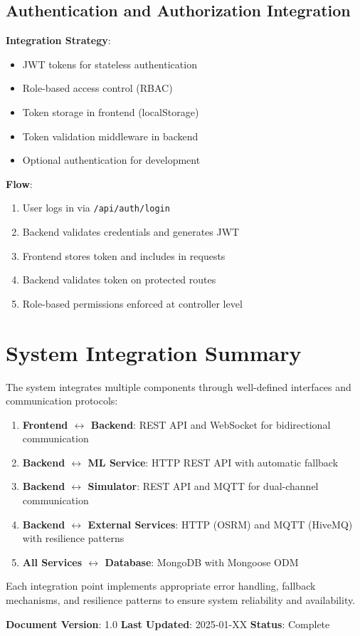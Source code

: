 \subsection{Authentication and Authorization Integration}

\textbf{Integration Strategy}:
\begin{itemize}
    \item JWT tokens for stateless authentication
    \item Role-based access control (RBAC)
    \item Token storage in frontend (localStorage)
    \item Token validation middleware in backend
    \item Optional authentication for development
\end{itemize}

\textbf{Flow}:
\begin{enumerate}
    \item User logs in via \texttt{/api/auth/login}
    \item Backend validates credentials and generates JWT
    \item Frontend stores token and includes in requests
    \item Backend validates token on protected routes
    \item Role-based permissions enforced at controller level
\end{enumerate}

\section{System Integration Summary}

The system integrates multiple components through well-defined interfaces and communication protocols:

\begin{enumerate}
    \item \textbf{Frontend $\leftrightarrow$ Backend}: REST API and WebSocket for bidirectional communication
    \item \textbf{Backend $\leftrightarrow$ ML Service}: HTTP REST API with automatic fallback
    \item \textbf{Backend $\leftrightarrow$ Simulator}: REST API and MQTT for dual-channel communication
    \item \textbf{Backend $\leftrightarrow$ External Services}: HTTP (OSRM) and MQTT (HiveMQ) with resilience patterns
    \item \textbf{All Services $\leftrightarrow$ Database}: MongoDB with Mongoose ODM
\end{enumerate}

Each integration point implements appropriate error handling, fallback mechanisms, and resilience patterns to ensure system reliability and availability.

\textbf{Document Version}: 1.0  
\textbf{Last Updated}: 2025-01-XX  
\textbf{Status}: \checkmark Complete